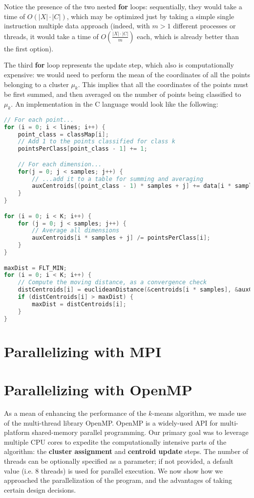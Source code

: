 \documentclass[11pt, journal]{IEEEtran}
\newcommand{\nwl}{

\vspace{11pt}

}
\begin{document}
Notice the presence of the two nested \textbf{for} loops: sequentially, they would take a time of $O(|X| \cdot |C|)$, which may be optimized just by taking a simple single instruction multiple data approach (indeed, with $m > 1$ different processes or threads, it would take a time of $O\left(\frac{|X| \cdot |C|}{m}\right)$ each, which is already better than the first option).
\nwl
The third \textbf{for} loop represents the update step, which also is computationally expensive: we would need to perform the mean of the coordinates of all the points belonging to a cluster $\mu_k$. This implies that all the coordinates of the points must be first summed, and then averaged on the number of points being classified to $\mu_k$. An implementation in the C language would look like the following:
\nwl
\begin{lstlisting}[language = C]
// For each point...
for (i = 0; i < lines; i++) {
    point_class = classMap[i];
    // Add 1 to the points classified for class k
    pointsPerClass[point_class - 1] += 1;

    // For each dimension...
    for(j = 0; j < samples; j++) {
        // ...add it to a table for summing and averaging
        auxCentroids[(point_class - 1) * samples + j] += data[i * samples + j];
    }
}

for (i = 0; i < K; i++) {
    for (j = 0; j < samples; j++) {
        // Average all dimensions
        auxCentroids[i * samples + j] /= pointsPerClass[i];
    }
}

maxDist = FLT_MIN;
for (i = 0; i < K; i++) {
    // Compute the moving distance, as a convergence check
    distCentroids[i] = euclideanDistance(&centroids[i * samples], &auxCentroids[i * samples], samples);
    if (distCentroids[i] > maxDist) {
        maxDist = distCentroids[i];
    }
}\end{lstlisting}

\section{Parallelizing with MPI}

\section{Parallelizing with OpenMP}

As a mean of enhancing the performance of the $k$-means algorithm, we made use of the multi-thread library OpenMP. OpenMP is a widely-used API for multi-platform shared-memory parallel programming. Our primary goal was to leverage multiple CPU cores to expedite the computationally intensive parts of the algorithm: the \textbf{cluster assignment} and \textbf{centroid update} steps. The number of threads can be optionally specified as a parameter; if not provided, a default value (i.e. 8 threads) is used for parallel execution.
We now show how we approached the parallelization of the program, and the advantages of taking certain design decisions.
 
\end{document}
